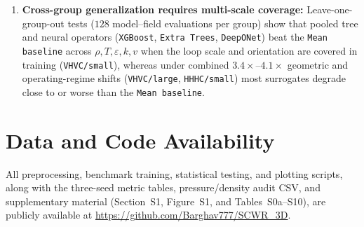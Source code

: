 \documentclass[11pt]{article}
\newcommand{\repourl}{https://github.com/Barghav777/SCWR_3D}
\begin{document}
\begin{enumerate}
  \item \textbf{Cross-group generalization requires multi-scale coverage:} Leave-one-group-out tests ($128$ model--field evaluations per group) show that pooled tree and neural operators (\texttt{XGBoost}, \texttt{Extra Trees}, \texttt{DeepONet}) beat the \texttt{Mean baseline} across $\rho, T, \varepsilon, k, v$ when the loop scale and orientation are covered in training (\texttt{VHVC/small}), whereas under combined $3.4\times\text{--}4.1\times$ geometric and operating-regime shifts (\texttt{VHVC/large}, \texttt{HHHC/small}) most surrogates degrade close to or worse than the \texttt{Mean baseline}.
\end{enumerate}

\section*{Data and Code Availability}
All preprocessing, benchmark training, statistical testing, and plotting scripts, along with the three-seed metric tables, pressure/density audit CSV, and supplementary material (Section~S1, Figure~S1, and Tables~S0a--S10), are publicly available at \url{\repourl}.
\end{document}
